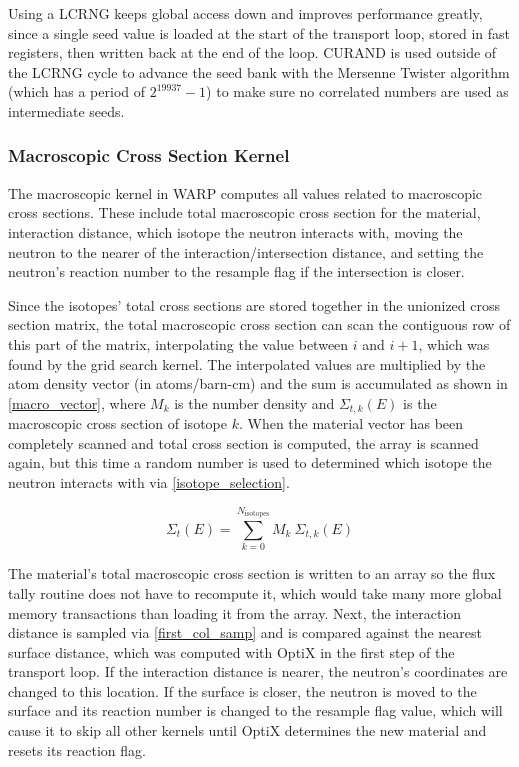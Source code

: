 Using a LCRNG keeps global access down and improves performance greatly, since a single seed value is loaded at the start of the transport loop, stored in fast registers, then written back at the end of the loop.  CURAND is used outside of the LCRNG cycle to advance the seed bank with the Mersenne Twister algorithm (which has a period of $2^{19937} - 1$) to make sure no correlated numbers are used as intermediate seeds.

\subsubsection{Macroscopic Cross Section Kernel}

The macroscopic kernel in WARP computes all values related to macroscopic cross sections.  These include total macroscopic cross section for the material, interaction distance, which isotope the neutron interacts with, moving the neutron to the nearer of the interaction/intersection distance, and setting the neutron's reaction number to the resample flag if the intersection is closer.  

Since the isotopes' total cross sections are stored together in the unionized cross section matrix, the total macroscopic cross section can scan the contiguous row of this part of the matrix, interpolating the value between $i$ and $i+1$, which was found by the grid search kernel.  The interpolated values are multiplied by the atom density vector (in atoms/barn-cm) and the sum is accumulated as shown in \eqref{macro_vector}, where $M_k$ is the number density and $\Sigma_{t,k}(E)$ is the macroscopic cross section of isotope $k$.  When the material vector has been completely scanned and total cross section is computed, the array is scanned again, but this time a random number is used to determined which isotope the neutron interacts with via \eqref{isotope_selection}.

\begin{equation}
\Sigma_t(E) = \sum_{k=0}^{N_\mathrm{isotopes}} M_k \: \Sigma_{t,k}(E)
\label{macro_vector}
\end{equation}

The material's total macroscopic cross section is written to an array so the flux tally routine does not have to recompute it, which would take many more global memory transactions than loading it from the array. %
 Next, the interaction distance is sampled via \eqref{first_col_samp} and is compared against the nearest surface distance, which was computed with OptiX in the first step of the transport loop.  If the interaction distance is nearer, the neutron's coordinates are changed to this location.  If the surface is closer, the neutron is moved to the surface and its reaction number is changed to the resample flag value, which will cause it to skip all other kernels until OptiX determines the new material and resets its reaction flag.

